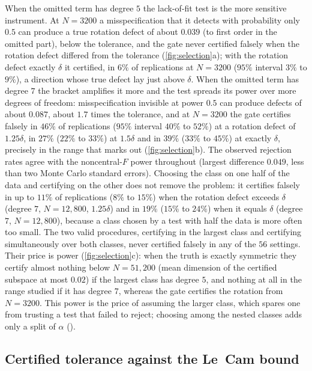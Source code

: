 When the omitted term has degree $5$ the lack-of-fit test is the more sensitive
instrument. At $N = 3200$ a misspecification that it detects with probability
only $0.5$ can produce a true rotation defect of about $0.039$ (to first order
in the omitted part), below the tolerance, and the gate never certified falsely
when the rotation defect differed from the tolerance (\cref{fig:selection}a);
with the rotation defect exactly $\delta$ it certified, in $6\%$ of
replications at $N = 3200$ ($95\%$ interval $3\%$ to $9\%$), a direction whose
true defect lay just above $\delta$. When the omitted term has degree $7$ the
bracket amplifies it more and the test spreads its power over more degrees of
freedom: misspecification invisible at power $0.5$ can produce defects of about
$0.087$, about $1.7$ times the tolerance, and at $N = 3200$ the gate certifies
falsely in $46\%$ of replications ($95\%$ interval $40\%$ to $52\%$) at a
rotation defect of $1.25\delta$, in $27\%$ ($22\%$ to $33\%$) at $1.5\delta$
and in $39\%$ ($33\%$ to $45\%$) at exactly $\delta$, precisely in the range
that  marks out (\cref{fig:selection}b). The observed rejection
rates agree with the noncentral-$F$ power throughout (largest difference
$0.049$, less than two Monte Carlo standard errors). Choosing the class on one
half of the data and certifying on the other does not remove the problem: it
certifies falsely in up to $11\%$ of replications ($8\%$ to $15\%$) when the
rotation defect exceeds $\delta$ (degree $7$, $N = 12{,}800$, $1.25\delta$) and
in $19\%$ ($15\%$ to $24\%$) when it equals $\delta$ (degree $7$, $N =
12{,}800$), because a class chosen by a test with half the data is more often
too small. The two valid procedures, certifying in the largest class and
certifying simultaneously over both classes, never certified falsely in any of
the $56$ settings. Their price is power (\cref{fig:selection}c): when the truth
is exactly symmetric they certify almost nothing below $N = 51{,}200$ (mean
dimension of the certified subspace at most $0.02$) if the largest class has
degree $5$, and nothing at all in the range studied if it has degree $7$,
whereas the gate certifies the rotation from $N = 3200$. This power is the
price of assuming the larger class, which spares one from trusting a test that
failed to reject; choosing among the nested classes adds only a split of
$\alpha$ ().

\subsection{Certified tolerance against the Le~Cam bound}
\label{sec:resolution}

